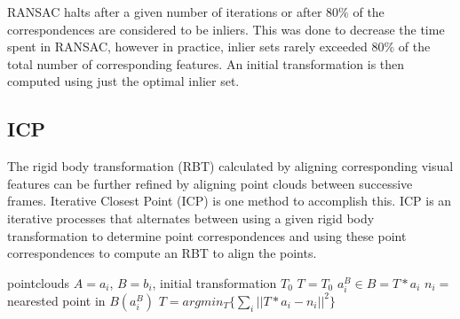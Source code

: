 \documentclass[letterpaper, 10pt, conference]{ieeeconf}
\begin{document}
RANSAC halts after a given number of iterations or after $80\%$ of the
correspondences are considered to be inliers.  This was done to decrease
the time spent in RANSAC, however in practice, inlier sets rarely exceeded
$80\%$ of the total number of corresponding features.  An initial
transformation is then computed using just the optimal inlier set.

\subsection{ICP}
	The rigid body transformation (RBT) calculated by aligning corresponding visual features can be further refined by aligning point clouds between successive frames.  Iterative Closest Point (ICP) is one method to accomplish this.  ICP is an iterative processes that alternates between using a given rigid body transformation to determine point correspondences and using these point correspondences to compute an RBT to align the points.  \newline


\begin{algorithm}
\begin{algorithmic}
\REQUIRE pointclouds $A = a_{i}$, $B = b_{i} $, initial transformation $T_{0}$
\STATE $T = T_{0}$
\STATE $a^{B}_{i} \in B = T * a_i$
\STATE $n_{i} =$ nearested point in $B(a^{B}_{i})$
\ENDFOR
\STATE $T = argmin_{T} \{\sum_{i} ||T * a_{i} - n_{i} ||^2\}$
\ENDWHILE
\end{algorithmic}
\end{algorithm}

\end{document}
